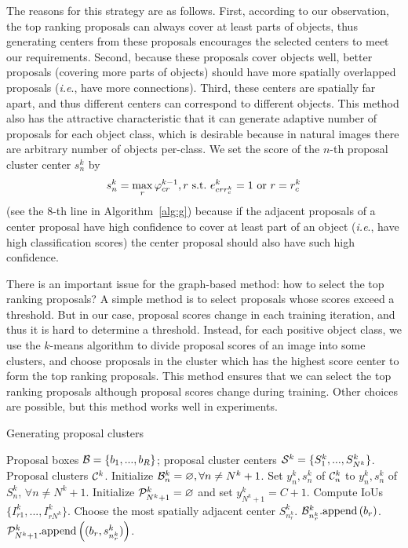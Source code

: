 \documentclass[10pt,journal,compsoc]{IEEEtran}
\def\ie{\emph{i.e}.} \def\Ie{\emph{I.e}.}
\begin{document}
The reasons for this strategy are as follows.
First, according to our observation,
the top ranking proposals can always cover at least parts of objects,
thus generating centers from these proposals encourages the selected centers to meet our requirements.
Second, because these proposals cover objects well, better proposals (covering more parts of objects) should have more spatially overlapped proposals (\ie, have more connections).
Third, these centers are spatially far apart,
and thus different centers can correspond to different objects.
This method also has the attractive characteristic that it can generate adaptive number of proposals for each object class,
which is desirable because in natural images there are arbitrary number of objects per-class.
We set the score of the $n$-th proposal cluster center $s^{k}_{n}$ by
$$s^{k}_{n} = \max_{r} \varphi^{k-1}_{cr}, r\ \textup{s.t.}\ e^{k}_{crr^{k}_{c}} = 1\ \textup{or}\ r = r^{k}_{c}$$
(see the $8$-th line in Algorithm~\ref{alg:g})
because if the adjacent proposals of a center proposal have high confidence to cover at least part of an object
(\ie, have high classification scores)
the center proposal should also have such high confidence.

There is an important issue for the graph-based method: how to select the top ranking proposals?
{A simple method is to select proposals whose scores exceed a threshold.
But in our case, proposal scores change in each training iteration,
and thus it is hard to determine a threshold.
Instead,}
for each positive object class,
we use the $k$-means \cite{Ref:Macqueen1967} algorithm to divide proposal scores of an image into some clusters,
and choose proposals in the cluster which has the highest score center to form the top ranking proposals.
{This method ensures that we can select the top ranking proposals although proposal scores change during training.}
Other choices are possible,
but this method works well in experiments.



\begin{algorithm}[t]
\caption{Generating proposal clusters}
\label{alg:pcg}
\begin{algorithmic}[1]
    \REQUIRE Proposal boxes ${\cal B} = \{b_{1}, ..., b_{R}\}$; proposal cluster centers ${\cal S}^{k} = \{S^{k}_{1}, ..., S^{k}_{N^{k}}\}$.
    \ENSURE Proposal clusters ${\cal C}^{k}$.
    \STATE Initialize ${\cal B}^{k}_{n} = \varnothing, \forall n \neq N^{k}+1$.
    \STATE Set $y^{k}_{n}, s^{k}_{n}$ of ${\cal C}^{k}_{n}$ to $y^{k}_{n}, s^{k}_{n}$ of $S^{k}_{n}$, $\forall n \neq N^{k}+1$.
    \STATE Initialize ${\cal P}^{k}_{N^{k}+1} = \varnothing$ and set $y^{k}_{N^{k}+1} = C + 1$.
      \STATE Compute IoUs $\{I^{k}_{r1}, ..., I^{k}_{rN^{k}}\}$.
      \STATE Choose the most spatially adjacent center $S^{k}_{n^{k}_{r}}$.
        \STATE ${\cal B}^{k}_{n^{k}_{r}}\textup{.append}\left(b_{r}\right)$.
      \ELSE
        \STATE ${\cal P}^{k}_{N^{k}+1}\textup{.append}\left((b_{r}, s^{k}_{n^{k}_{r}})\right)$.
      \ENDIF
    \ENDFOR
\end{algorithmic}
\end{algorithm}
\end{document}
